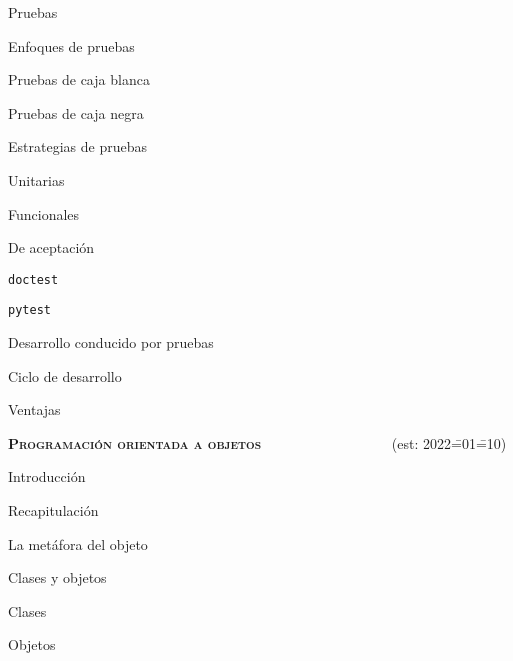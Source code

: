 \begin{longenum}
\begin{longenum}
\begin{longenum}
        \end{longenum}
        \item Pruebas
        \begin{longenum}
            \item Enfoques de pruebas
            \begin{longenum}
                \item Pruebas de caja blanca
                \item Pruebas de caja negra
            \end{longenum}
            \item Estrategias de pruebas
            \begin{longenum}
                \item Unitarias
                \item Funcionales
                \item De aceptación
            \end{longenum}
            \item \texttt{doctest}
            \item \texttt{pytest}
            \item Desarrollo conducido por pruebas
            \begin{longenum}
                \item Ciclo de desarrollo
                \item Ventajas
            \end{longenum}
        \end{longenum}
    \end{longenum}
    \item \textbf{\textsc{Programación orientada a objetos}} \ \ \ \ \ \ \ \ \ \ \ \ \ \ \ \ \ \ (est: 2022\==01\==10)
    \begin{longenum}
        \item Introducción
        \begin{longenum}
            \item Recapitulación
            \item La metáfora del objeto
        \end{longenum}
        \item Clases y objetos
        \begin{longenum}
            \item Clases
            \item Objetos

\end{longenum}
\end{longenum}
\end{longenum}

